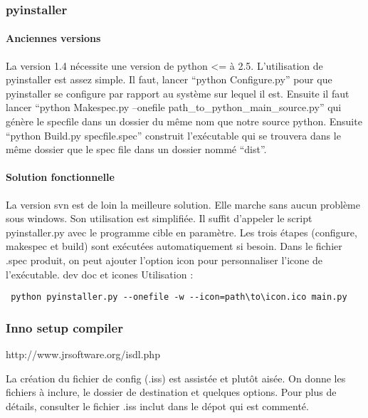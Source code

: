 \documentclass[12pt,a4paper]{article}
\begin{document}
        \subsubsection{pyinstaller}

        \paragraph{Anciennes versions}

        La version 1.4 nécessite une version de python <= à 2.5. L'utilisation de pyinstaller est assez simple. Il faut, 
        lancer ``python Configure.py'' pour que pyinstaller se configure par rapport au système sur lequel il est. Ensuite il faut
        lancer ``python Makespec.py --onefile path\_to\_python\_main\_source.py'' qui génère le specfile dans un dossier du même nom que
        notre source python. Ensuite ``python Build.py specfile.spec'' construit l'exécutable qui se trouvera dans le même dossier que le spec file
        dans un dossier nommé ``dist''.

        \paragraph{Solution fonctionnelle}

        La version svn est de loin la meilleure solution. Elle marche sans aucun problème sous windows. Son utilisation est simplifi\'ee.
        Il suffit d'appeler le script pyinstaller.py avec le programme cible en paramètre. Les trois \'etapes (configure, makespec et build)
        sont ex\'ecut\'ees automatiquement si besoin. Dans le fichier .spec produit, on peut ajouter l'option icon pour personnaliser l'icone 
        de l'ex\'ecutable.
		dev doc et icones
		Utilisation : \begin{verbatim} python pyinstaller.py --onefile -w --icon=path\to\icon.ico main.py \end{verbatim}

        \subsubsection{Inno setup compiler}
        http://www.jrsoftware.org/isdl.php

        La cr\'eation du fichier de config (.iss) est assist\'ee et plutôt ais\'ee. On donne les fichiers à inclure, le dossier de destination
        et quelques options. Pour plus de d\'etails, consulter le fichier .iss inclut dans le d\'epot qui est comment\'e.
\end{document}

